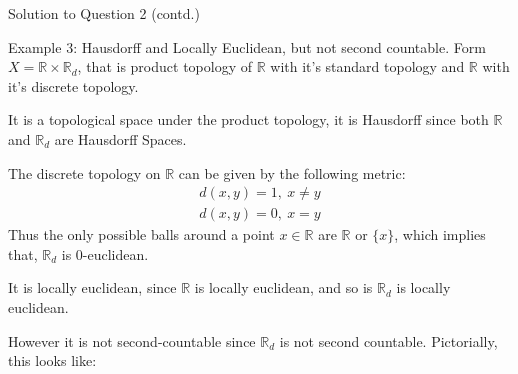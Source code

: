 \documentclass{beamer}
\begin{document}
\begin{frame}{Solution to Question 2 (contd.)}
\begin{block}{Example 3: Hausdorff and Locally Euclidean, but not second countable.}
Form $\displaystyle X=\mathbb{R} \times \mathbb{R}_{d}$, that is product topology of $\displaystyle \mathbb{R}$ with it's standard topology and $\displaystyle \mathbb{R}$ with it's discrete topology.

It is a topological space under the product topology, it is Hausdorff since both $\displaystyle \mathbb{R}$ and $\displaystyle \mathbb{R}_{d}$ are Hausdorff Spaces.

The discrete topology on $\displaystyle \mathbb{R}$ can be given by the following metric: 
\begin{gather*}
d( x,y) =1,\ x\neq y\\
d( x,y) =0,\ x=y
\end{gather*} 
Thus the only possible balls around a point $\displaystyle x\in \mathbb{R}$ are $\displaystyle \mathbb{R}$ or $\displaystyle \{x\}$, which implies that, $\displaystyle \mathbb{R}_{d}$ is $\displaystyle 0$-euclidean.

It is locally euclidean, since $\displaystyle \mathbb{R}$ is locally euclidean, and so is $\displaystyle \mathbb{R}_{d}$ is locally euclidean. 

However it is not second-countable since $\displaystyle \mathbb{R}_{d}$ is not second countable. 
Pictorially, this looks like:
\end{block}  
\end{frame}
\end{document}
